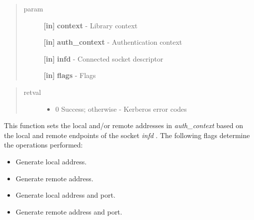 \documentclass[letterpaper,10pt,english]{sphinxmanual}
\begin{document}
\begin{quote}\begin{description}
\item[{param}] \leavevmode
\textbf{{[}in{]}} \textbf{context} - Library context

\textbf{{[}in{]}} \textbf{auth\_context} - Authentication context

\textbf{{[}in{]}} \textbf{infd} - Connected socket descriptor

\textbf{{[}in{]}} \textbf{flags} - Flags

\end{description}\end{quote}
\begin{quote}\begin{description}
\item[{retval}] \leavevmode\begin{itemize}
\item {} 
0   Success; otherwise - Kerberos error codes

\end{itemize}

\end{description}\end{quote}

This function sets the local and/or remote addresses in \emph{auth\_context} based on the local and remote endpoints of the socket \emph{infd} . The following flags determine the operations performed:
\begin{itemize}
\item {} 
{\hyperref[appdev/refs/macros/KRB5_AUTH_CONTEXT_GENERATE_LOCAL_ADDR:KRB5_AUTH_CONTEXT_GENERATE_LOCAL_ADDR]{}} Generate local address.

\item {} 
{\hyperref[appdev/refs/macros/KRB5_AUTH_CONTEXT_GENERATE_REMOTE_ADDR:KRB5_AUTH_CONTEXT_GENERATE_REMOTE_ADDR]{}} Generate remote address.

\item {} 
{\hyperref[appdev/refs/macros/KRB5_AUTH_CONTEXT_GENERATE_LOCAL_FULL_ADDR:KRB5_AUTH_CONTEXT_GENERATE_LOCAL_FULL_ADDR]{}} Generate local address and port.

\item {} 
{\hyperref[appdev/refs/macros/KRB5_AUTH_CONTEXT_GENERATE_REMOTE_FULL_ADDR:KRB5_AUTH_CONTEXT_GENERATE_REMOTE_FULL_ADDR]{}} Generate remote address and port.

\end{itemize}
\end{document}
